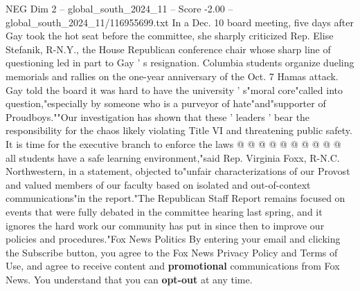 \begin{textsample}{NEG Dim 2 – global\_south\_2024\_11 – Score -2.00 – global\_south\_2024\_11/116955699.txt}
In a Dec. 10 board meeting, five days after Gay took the hot seat before the committee, she sharply criticized Rep.
Elise Stefanik, R-N.Y., the House Republican conference chair whose sharp line of questioning led in part to Gay ' s resignation.
Columbia students organize dueling memorials and rallies on the one-year anniversary of the Oct. 7 Hamas attack.
Gay told the board it was hard to have the university ' s"moral core"called into question,"especially by someone who is a purveyor of hate"and"supporter of Proudboys.""Our investigation has shown that these ' leaders ' bear the responsibility for the chaos likely violating Title VI and threatening public safety.
It is time for the executive branch to enforce the laws @ @ @ @ @ @ @ @ @ @ all students have a safe learning environment,"said Rep.
Virginia Foxx, R-N.C.
Northwestern, in a statement, objected to"unfair characterizations of our Provost and valued members of our faculty based on isolated and out-of-context communications"in the report."The Republican Staff Report remains focused on events that were fully debated in the committee hearing last spring, and it ignores the hard work our community has put in since then to improve our policies and procedures."Fox News Politics By entering your email and clicking the Subscribe button, you agree to the Fox News Privacy Policy and Terms of Use, and agree to receive content and \textbf{promotional} communications from Fox News.
You understand that you can \textbf{opt-out} at any time.

\end{textsample}
